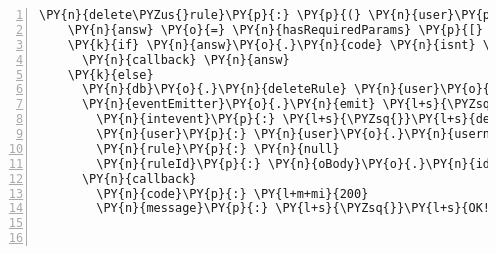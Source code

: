 \begin{Verbatim}[fontsize=\scriptsize,commandchars=\\\{\},numbers=left,firstnumber=1,stepnumber=1]
  \PY{n}{delete\PYZus{}rule}\PY{p}{:} \PY{p}{(} \PY{n}{user}\PY{p}{,} \PY{n}{oBody}\PY{p}{,} \PY{n}{callback} \PY{p}{)} \PY{o}{\PYZhy{}}\PY{o}{\PYZgt{}}
    \PY{n}{answ} \PY{o}{=} \PY{n}{hasRequiredParams} \PY{p}{[} \PY{l+s}{\PYZsq{}}\PY{l+s}{id}\PY{l+s}{\PYZsq{}} \PY{p}{]}\PY{p}{,} \PY{n}{oBody}
    \PY{k}{if} \PY{n}{answ}\PY{o}{.}\PY{n}{code} \PY{n}{isnt} \PY{l+m+mi}{200}
      \PY{n}{callback} \PY{n}{answ}
    \PY{k}{else}
      \PY{n}{db}\PY{o}{.}\PY{n}{deleteRule} \PY{n}{user}\PY{o}{.}\PY{n}{username}\PY{p}{,} \PY{n}{oBody}\PY{o}{.}\PY{n}{id}
      \PY{n}{eventEmitter}\PY{o}{.}\PY{n}{emit} \PY{l+s}{\PYZsq{}}\PY{l+s}{rule}\PY{l+s}{\PYZsq{}}\PY{p}{,}
        \PY{n}{intevent}\PY{p}{:} \PY{l+s}{\PYZsq{}}\PY{l+s}{del}\PY{l+s}{\PYZsq{}}
        \PY{n}{user}\PY{p}{:} \PY{n}{user}\PY{o}{.}\PY{n}{username}
        \PY{n}{rule}\PY{p}{:} \PY{n}{null}
        \PY{n}{ruleId}\PY{p}{:} \PY{n}{oBody}\PY{o}{.}\PY{n}{id}
      \PY{n}{callback}
        \PY{n}{code}\PY{p}{:} \PY{l+m+mi}{200}
        \PY{n}{message}\PY{p}{:} \PY{l+s}{\PYZsq{}}\PY{l+s}{OK!}\PY{l+s}{\PYZsq{}}



\end{Verbatim}
